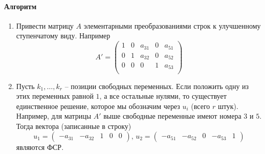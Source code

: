 \paragraph{Алгоритм}
\begin{enumerate}
\item Привести матрицу $A$ элементарными преобразованиями строк к улучшенному ступенчатому виду.
Например
\[
A' = 
\begin{pmatrix}
{1}&{0}&{a_{31}}&{0}&{a_{51}}\\
{0}&{1}&{a_{32}}&{0}&{a_{52}}\\
{0}&{0}&{0}&{1}&{a_{53}}\\
\end{pmatrix}
\]

\item Пусть $k_1,\ldots,k_r$ -- позиции свободных переменных.
Если положить одну из этих переменных равной $1$, а все остальные нулями, то существует единственное решение, которое мы обозначим через $u_i$ (всего $r$ штук).
Например, для матрицы $A'$ выше свободные переменные имеют номера $3$ и $5$.
Тогда вектора (записанные в строку)
\[
u_1 = 
\begin{pmatrix}
{-a_{31}}&{-a_{32}}&{1}&{0}&{0}
\end{pmatrix},\,
u_2 = 
\begin{pmatrix}
{-a_{51}}&{-a_{52}}&{0}&{-a_{53}}&{1}
\end{pmatrix}
\]
являются ФСР.
\end{enumerate}

